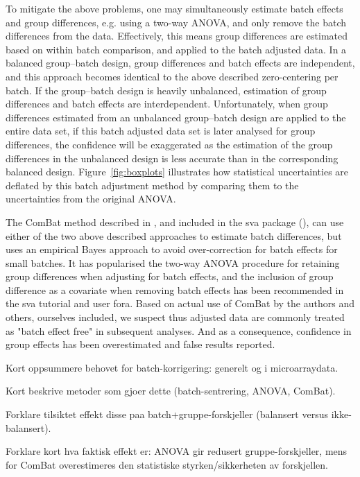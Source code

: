 \documentclass{bio}
\newcommand\NB[1]{{\color{red}#1}}
\begin{document}
To mitigate the above problems, one may simultaneously estimate batch effects and group differences, e.g. using a two-way ANOVA, and only remove the batch differences from the data. Effectively, this means group differences are estimated based on within batch comparison, and applied to the batch adjusted data. In a balanced group--batch design, group differences and batch effects are independent, and this approach becomes identical to the above described zero-centering per batch. If the group--batch design is heavily unbalanced, estimation of group differences and batch effects are interdependent. Unfortunately, when group differences estimated from an unbalanced group--batch design are applied to the entire data set, if this batch adjusted data set is later analysed for group differences, the confidence will be exaggerated as the estimation of the group differences in the unbalanced design is less accurate than in the corresponding balanced design. Figure~\ref{fig:boxplots} illustrates how statistical uncertainties are deflated by this batch adjustment method by comparing them to the uncertainties from the original ANOVA.

The ComBat method described in \citet{Johnson2007}, and included in the sva package (\citealp{Leek2012}), can use either of the two above described approaches to estimate batch differences, but uses an empirical Bayes approach to avoid over-correction for batch effects for small batches. It has popularised the two-way ANOVA procedure for retaining group differences when adjusting for batch effects, and the inclusion of group difference as a covariate when removing batch effects has been recommended in the sva tutorial and user fora. Based on actual use of ComBat by the authors and others, ourselves included, we suspect thus adjusted data are commonly treated as "batch effect free" in subsequent analyses. And as a consequence, confidence in group effects has been overestimated and false results reported.

\NB{Kort oppsummere behovet for batch-korrigering: generelt og i microarraydata.}

\NB{Kort beskrive metoder som gjoer dette (batch-sentrering, ANOVA, ComBat).}

\NB{Forklare tilsiktet effekt disse paa batch+gruppe-forskjeller (balansert versus ikke-balansert).}

\NB{Forklare kort hva faktisk effekt er: ANOVA gir redusert gruppe-forskjeller, mens for ComBat overestimeres den statistiske styrken/sikkerheten av forskjellen.}
\end{document}
